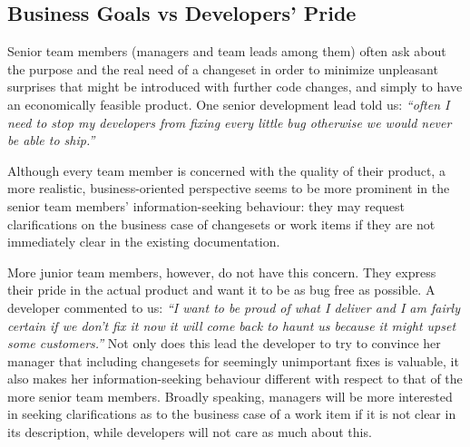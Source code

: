 

\subsection{Business Goals vs Developers' Pride}

Senior team members (managers and team leads among them) often ask about the purpose and the real need of a changeset in order to minimize unpleasant surprises that might be introduced with further code changes, and simply to have an economically feasible product. One senior development lead told us: \emph{``often I need to stop my developers from fixing every little bug otherwise we would never be able to ship.''}

Although every team member is concerned with the quality of their product, a more realistic, business-oriented perspective seems to be more prominent in the senior team members' information-seeking behaviour: they may request clarifications on the business case of changesets or work items if they are not immediately clear in the existing documentation.

More junior team members, however, do not have this concern. They express their pride in the actual product and want it to be as bug free as possible. A developer commented to us: \emph{``I want to be proud of what I deliver and I am fairly certain if we don't fix it now it will come back to haunt us because it might upset some customers.''} Not only does this lead the developer to try to convince her manager that including changesets for seemingly unimportant fixes is valuable, it also makes her information-seeking behaviour different with respect to that of the more senior team members. Broadly speaking, managers will be more interested in seeking clarifications as to the business case of a work item if it is not clear in its description, while developers will not care as much about this.



